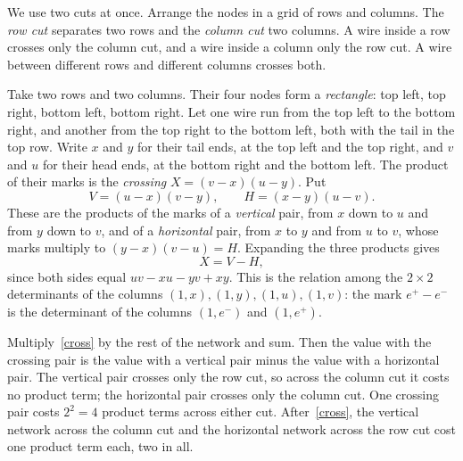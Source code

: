 \documentclass[11pt]{article}
\begin{document}
We use two cuts at once. Arrange the nodes in a grid of rows and columns. The \emph{row cut} separates two rows and the \emph{column cut} two columns. A wire inside a row crosses only the column cut, and a wire inside a column only the row cut. A wire between different rows and different columns crosses both.

Take two rows and two columns. Their four nodes form a \emph{rectangle}: top left, top right, bottom left, bottom right. Let one wire run from the top left to the bottom right, and another from the top right to the bottom left, both with the tail in the top row. Write $x$ and $y$ for their tail ends, at the top left and the top right, and $v$ and $u$ for their head ends, at the bottom right and the bottom left. The product of their marks is the \emph{crossing} $X=(v-x)(u-y)$. Put
\[
V=(u-x)(v-y),\qquad H=(x-y)(u-v).
\]
These are the products of the marks of a \emph{vertical} pair, from $x$ down to $u$ and from $y$ down to $v$, and of a \emph{horizontal} pair, from $x$ to $y$ and from $u$ to $v$, whose marks multiply to $(y-x)(v-u)=H$. Expanding the three products gives
\begin{equation}\label{cross}
X=V-H,
\end{equation}
since both sides equal $uv-xu-yv+xy$. This is the relation among the $2\times2$ determinants of the columns $(1,x),(1,y),(1,u),(1,v)$: the mark $e^+-e^-$ is the determinant of the columns $(1,e^-)$ and $(1,e^+)$.

\begin{center}
\end{center}

Multiply~\eqref{cross} by the rest of the network and sum. Then the value with the crossing pair is the value with a vertical pair minus the value with a horizontal pair. The vertical pair crosses only the row cut, so across the column cut it costs no product term; the horizontal pair crosses only the column cut. One crossing pair costs $2^2=4$ product terms across either cut. After~\eqref{cross}, the vertical network across the column cut and the horizontal network across the row cut cost one product term each, two in all.
\end{document}
